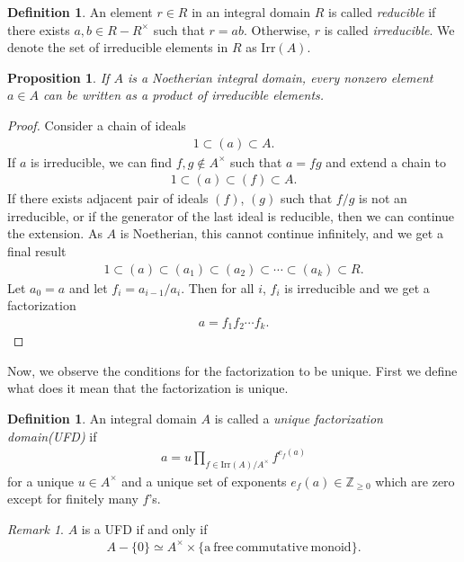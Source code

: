 \documentclass[12pt]{report}
\theoremstyle{plain}
\newtheorem{proposition}[theorem]{Proposition}
\theoremstyle{remark}
\newtheorem*{remark}{Remark}
\theoremstyle{definition}
\newtheorem{definition}[theorem]{Definition}
\newcommand{\Z}{\mathbb{Z}}
\begin{document}
\begin{definition}
    An element $r\in R$ in an integral domain $R$ is called \emph{reducible} if there exists $a,b\in R-R^\times$ such that $r=ab$. Otherwise, $r$ is called \emph{irreducible}. We denote the set of irreducible elements in $R$ as $\mathrm{Irr}(A)$.
\end{definition}

\begin{proposition}
    If $A$ is a Noetherian integral domain, every nonzero element $a\in A$ can be written as a product of irreducible elements. 
\end{proposition}
\begin{proof}
    Consider a chain of ideals
    \begin{align*}
        1 \subset (a) \subset A.
    \end{align*}
    If $a$ is irreducible, we can find $f,g\notin A^\times$ such that $a=fg$ and extend a chain to
    \begin{align*}
        1 \subset (a) \subset (f) \subset A.
    \end{align*}
    If there exists adjacent pair of ideals $(f)$, $(g)$ such that $f/g$ is not an irreducible, or if the generator of the last ideal is reducible, then we can continue the extension. As $A$ is Noetherian, this cannot continue infinitely, and we get a final result
    \begin{align*}
        1 \subset (a) \subset (a_1)\subset (a_2)\subset\cdots\subset (a_k)\subset R. 
    \end{align*}
    Let $a_0=a$ and let $f_i = a_{i-1}/a_i$. Then for all $i$, $f_i$ is irreducible and we get a factorization
    \begin{align*}
        a = f_1f_2\cdots f_k.
    \end{align*}
\end{proof}

Now, we observe the conditions for the factorization to be unique. First we define what does it mean that the factorization is unique.

\begin{definition}
    An integral domain $A$ is called a \emph{unique factorization domain(UFD)} if
    \begin{align*}
        a = u\prod_{f\in \mathrm{Irr}(A)/A^\times} f^{e_f(a)}
    \end{align*}
    for a unique $u\in A^\times$ and a unique set of exponents $e_f(a)\in \Z_{\ge 0}$ which are zero except for finitely many $f$'s.
\end{definition}
\begin{remark}
    $A$ is a UFD if and only if
    \begin{align*}
        A-\{0\} \simeq A^\times \times \{\mathrm{a~free~commutative~monoid}\}.
    \end{align*}
\end{remark}
\end{document}
